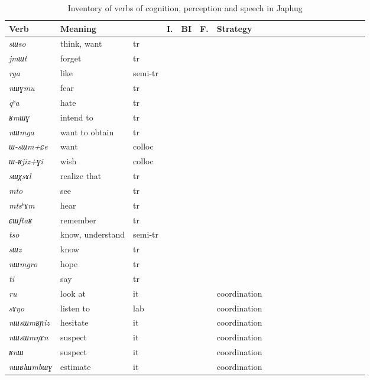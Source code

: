\documentclass[oneside,a4paper,11pt]{article}
\newcommand{\ipa}[1]{\textit{\phon#1}}
\newcommand{\N}{}
\newcommand{\Y}{\Checkmark}
\begin{document}
 
\begin{table}[H]
\caption{Inventory of verbs of cognition, perception and speech in Japhug} \label{tab:cognition} 
\begin{tabular}{lllllllllllllllllll}
\toprule
Verb & 	Meaning & 	 & 	I. & 	BI & 	F. & 	Strategy & 	\\
\midrule
\ipa{sɯso} & 	think, want & 	tr  & 	\Y &  	\N & 	\Y & 	\N & 	\\
\ipa{jmɯt} & 	forget & 	tr  & 	\Y & 	 	\N & 	\Y & 	\N & 	\\
\ipa{rga} & 	like & 	semi-tr & 	\Y & 		\N & 	\Y & 	\N & 	\\
\ipa{nɯɣmu} & 	fear & 	tr  & 	\Y & 	 	\N & 	\Y & 	\N & 	\\
\ipa{qʰa} & 	hate & 	tr  & 	\Y & 		\N & 	\Y & 	\N & 	\\
\ipa{ʁmɯɣ} & 	intend to & 	tr  & 	\Y & 	\N & 	\Y & 	\N & 	\\
\ipa{nɯmga} & 	want to obtain & 	tr  & 	\Y & 	\N & 	\Y & 	\N & 	\\
\ipa{ɯ-sɯm+ɕe} & 	want & 	colloc & 	\Y &  	\N & 	\Y & 	\N & 	\\
\ipa{ɯ-ʁjiz+ɣi} & 	wish & 	colloc & 	\Y &  	\N & 	\Y & 	\N & 	\\
\midrule
\ipa{sɯχsɤl} & 	realize that & 	tr  & 	\N & 	\N & 	\Y & 	\N & 	\\
\ipa{mto} & 	see & 	tr  & 	\N &  	\N & 	\Y & 	\N & 	\\
\ipa{mtsʰɤm} & 	hear & 	tr  & 	\N &   	\N & 	\Y & 	\N & 	\\
\ipa{ɕɯftaʁ} & 	remember & 	tr  & 	\N &   	\N & 	\Y & 	\N & 	\\
\ipa{tso} & 	know, understand & 	semi-tr & 	\N &  	\N & 	\Y & 	\N & 	\\
\ipa{sɯz} & 	know & 	tr  & 	\N &  	\N & 	\Y & 	\N & 	\\
\ipa{nɯmgro} & 	hope & 	tr  & 	\N & 	 	\N & 	\Y & 	\N & 	\\
\ipa{ti} & 	say & 	tr  & 	\N &  	\N & 	\Y & 	\N & 	\\
\midrule
\ipa{ru} & 	look at & 	it & 	\N &  	\N & 	\N & 	coordination & 	\\
\ipa{sɤŋo} & 	listen to & 	lab & 	\N & 	  	\N & 	\N & 	coordination & 	\\
\ipa{nɯsɯmʁɲiz} & 	hesitate & 	it & 	\N & 	  	\N & 	\N & 	coordination & 	\\
\ipa{nɯsɯmŋɤn} & 	suspect & 	it & 	\N &   	\N & 	\N & 	coordination & 	\\
\ipa{ʁnɯ} & 	suspect & 	it & 	\N &  	\N & 	\N & 	coordination & 	\\
\ipa{nɯʁlɯmbɯɣ} & 	estimate & 	it & 	\N & 	 	\N & 	\N & 	coordination & 	\\
\bottomrule
\end{tabular}
\end{table}
\end{document}
